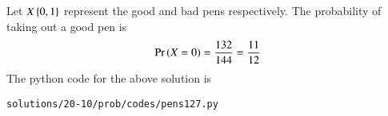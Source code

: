 Let $X \left\{0,1\right\}$ represent the good and bad pens respectively.
The probability of taking out a good pen is 
\begin{align}
\Pr\left(X=0\right) =  \frac{132}{144}
= \frac{11}{12}
\end{align}
The python code for the above solution is
\begin{lstlisting}
solutions/20-10/prob/codes/pens127.py
\end{lstlisting}
